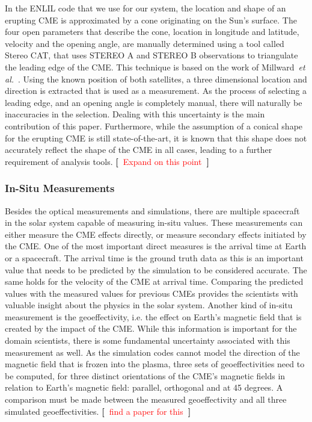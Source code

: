 \documentclass[journal]{vgtc}                %
\def\etal{\textit{et al.}}
\newcommand{\todo}[1] {\textbf{[~}\textcolor {red}{#1}\marginpar{\textcolor {red}{\centerline{{\Huge \textbf{!}}}}}\textbf{~]}}
\def\etal{\textit{et al.}}
\newcommand{\todo}[1] {\textbf{[~}\textcolor {red}{#1}\marginpar{\textcolor {red}{\centerline{{\Huge \textbf{!}}}}}\textbf{~]}}
\begin{document}
In the ENLIL code that we use for our system, the location and shape of an erupting CME is approximated by a cone originating on the Sun's surface. The four open parameters that describe the cone, location in longitude and latitude, velocity and the opening angle, are manually determined using a tool called Stereo CAT, that uses STEREO A and STEREO B observations to triangulate the leading edge of the CME. This technique is based on the work of Millward~\etal~\cite{Millward:2013cm}. Using the known position of both satellites, a three dimensional location and direction is extracted that is used as a measurement. As the process of selecting a leading edge, and an opening angle is completely manual, there will naturally be inaccuracies in the selection. Dealing with this uncertainty is the main contribution of this paper. Furthermore, while the assumption of a conical shape for the erupting CME is still state-of-the-art, it is known that this shape does not accurately reflect the shape of the CME in all cases, leading to a further requirement of analysis tools. \todo{Expand on this point}

\subsubsection{In-Situ Measurements} \label{sec:insitu}
Besides the optical measurements and simulations, there are multiple spacecraft in the solar system capable of measuring in-situ values. These measurements can either measure the CME effects directly, or measure secondary effects initiated by the CME. One of the most important direct measures is the arrival time at Earth or a spacecraft. The arrival time is the ground truth data as this is an important value that needs to be predicted by the simulation to be considered accurate. The same holds for the velocity of the CME at arrival time. Comparing the predicted values with the measured values for previous CMEs provides the scientists with valuable insight about the physics in the solar system. Another kind of in-situ measurement is the geoeffectivity, i.e. the effect on Earth's magnetic field that is created by the impact of the CME. While this information is important for the domain scientists, there is some fundamental uncertainty associated with this measurement as well. As the simulation codes cannot model the direction of the magnetic field that is frozen into the plasma, three sets of geoeffectivities need to be computed, for three distinct orientations of the CME's magnetic fields in relation to Earth's magnetic field:  parallel, orthogonal and at 45 degrees. A comparison must be made between the measured geoeffectivity and all three simulated geoeffectivities. \todo{find a paper for this}
\end{document}
